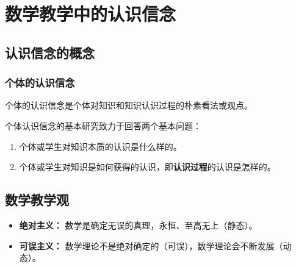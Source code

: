 \chapter{数学教学中的认识信念}

\section{认识信念的概念}


\subsection{个体的认识信念}
个体的认识信念是个体对知识和知识认识过程的朴素看法或观点。

个体认识信念的基本研究致力于回答两个基本问题：
\begin{enumerate}
    \item 个体或学生对知识本质的认识是什么样的。
    \item 个体或学生对知识是如何获得的认识，即\textbf{认识过程}的认识是怎样的。
\end{enumerate}

\section{数学教学观}
\begin{itemize}
    \item \textbf{绝对主义：} 数学是确定无误的真理，永恒、至高无上（静态）。
    \item \textbf{可误主义：} 数学理论不是绝对确定的（可误），数学理论会不断发展（动态）。
\end{itemize}

